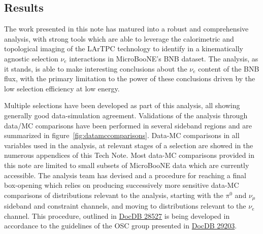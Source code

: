 \subsection{Results}
\label{sec:introduction:conclusions}
\par The work presented in this note has matured into a robust and comprehensive analysis, with strong tools which are able to leverage the calorimetric and topological imaging of the LArTPC technology to identify in a kinematically agnostic selection $\nu_e$ interactions in MicroBooNE's BNB dataset. The analysis, as it stands, is able to make interesting conclusions about the $\nu_e$ content of the BNB flux, with the primary limitation to the power of these conclusions driven by the low selection efficiency at low energy.
\par Multiple selections have been developed as part of this analysis, all showing generally good data-simulation agreement. Validations of the analysis through data/MC comparisons have been performed in several sideband regions and are summarized in figure~\ref{fig:datamccomparisons}. Data-MC comparisons in all variables used in the analysis, at relevant stages of a selection are showed in the numerous appendices of this Tech Note. Most data-MC comparisons provided in this note are limited to small subsets of MicroBooNE data which are currently accessible. The analysis team has devised and a procedure for reaching a final box-opening which relies on producing successively more sensitive data-MC comparisons of distributions relevant to the analysis, starting with the $\pi^0$ and $\nu_{\mu}$ sideband and constraint channels, and moving to distributions relevant to the $\nu_e$ channel. This procedure, outlined in \href{https://microboone-docdb.fnal.gov/cgi-bin/private/ShowDocument?docid=28527}{DocDB 28527} is being developed in accordance to the guidelines of the OSC group presented in \href{https://microboone-docdb.fnal.gov/cgi-bin/private/ShowDocument?docid=29203}{DocDB 29203}.

